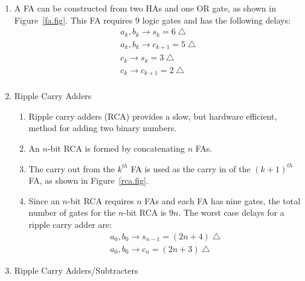 \documentclass[times, twocolumn, 10pt]{article}
\begin{document}
\begin{enumerate}
\begin{enumerate}
\begin{enumerate}
    \item A FA can be constructed from two HAs and one OR gate, as
      shown in Figure~\ref{fa.fig}.
      This FA requires 9 logic gates and has the following delays: 
      \begin{eqnarray*}
	a_{k}, b_{k} \rightarrow s_{k} = 6 \bigtriangleup \\
	a_{k}, b_{k} \rightarrow c_{k+1} = 5 \bigtriangleup \\
	c_{k} \rightarrow s_{k} = 3 \bigtriangleup \\
	c_{k} \rightarrow c_{k+1} = 2 \bigtriangleup \\
      \end{eqnarray*}
      \begin{figure*}
	\label{fa.fig}
	\begin{center}
	  \setlength{\unitlength}{0.0105in}%
	\end{center}
	\caption{FA Implementation.}
      \end{figure*}
    \item Ripple Carry Adders
      \begin{enumerate}
      \item Ripple carry adders (RCA) provides a slow, but hardware
        efficient, method for adding 
	two binary numbers. 
      \item An $n$-bit RCA is formed by concatenating $n$ FAs. 
      \item The carry out from the $k^{th}$ FA is used as the carry in of 
	the $(k + 1)^{th}$ FA, as shown in Figure~\ref{rca.fig}. 
	\begin{figure*}
	  \label{rca.fig}
	  \begin{center}
	    \setlength{\unitlength}{0.0105in}%
	  \end{center}
	  \caption{RCA Implementation.}
	\end{figure*}
      \item Since an $n$-bit RCA requires $n$ FAs and each FA has nine gates, 
	the total number of gates for the $n$-bit RCA is $9n$. The worst case 
	delays for a ripple carry adder are:
	\begin{eqnarray*}
	  a_{0}, b_{0} \rightarrow s_{n-1} = (2n + 4) \bigtriangleup \\
	  a_{0}, b_{0} \rightarrow c_{n} = (2n + 3) \bigtriangleup
	\end{eqnarray*}
      \end{enumerate}
    \item Ripple Carry Adders/Subtracters

\end{enumerate}
\end{enumerate}
\end{enumerate}
\end{document}
